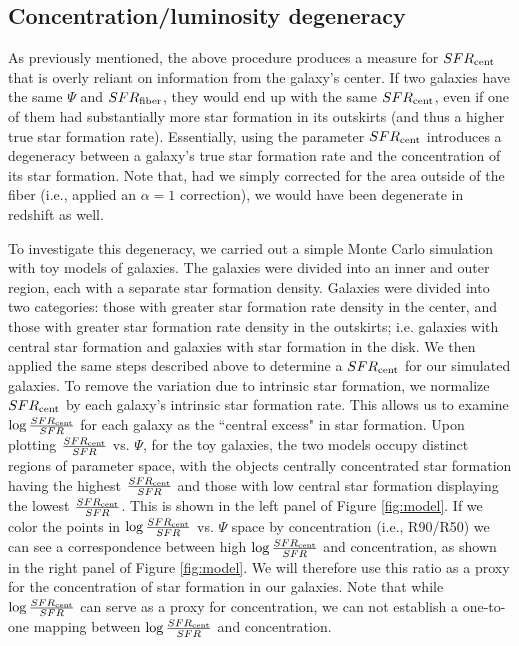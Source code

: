 \documentclass[iop]{emulateapj}
\begin{document}
\subsection{Concentration/luminosity degeneracy}
\label{sec:concdep}
As previously mentioned, the above procedure produces a measure for $SFR_{\rm cent}$ that is overly reliant on information from the galaxy's center. If two galaxies have the same $\Psi$ and $SFR_{\rm fiber}$, they would end up with the same $SFR_{\rm cent}$, even if one of them had substantially more star formation in its outskirts (and thus a higher true star formation rate). Essentially, using the parameter $SFR_{\rm cent}$ introduces a degeneracy between a galaxy's true star formation rate and the concentration of its star formation. Note that, had we simply corrected for the area outside of the fiber (i.e., applied an $\alpha= 1$ correction), we would have been degenerate in redshift as well.

To investigate this degeneracy, we carried out a simple Monte Carlo simulation with toy models of galaxies. The galaxies were divided into an inner and outer region, each with a separate star formation density. Galaxies were divided into two categories: those with greater star formation rate density in the center, and those with greater star formation rate density in the outskirts; i.e. galaxies with central star formation and galaxies with star formation in the disk. We then applied the same steps described above to determine a $SFR_{\rm cent}$ for our simulated galaxies. To remove the variation due to intrinsic star formation, we normalize $SFR_{\rm cent}$ by each galaxy's intrinsic star formation rate. This allows us to examine $ \log \frac{SFR_{\rm cent}}{SFR}$ for each galaxy as the ``central excess" in star formation. Upon plotting $\frac{SFR_{\rm cent}}{SFR}$ vs. $\Psi$, for the toy galaxies, the two models occupy distinct regions of parameter space, with the objects centrally concentrated star formation having the highest $\frac{SFR_{\rm cent}}{SFR}$ and those with low central star formation displaying the lowest $\frac{SFR_{\rm cent}}{SFR}$. This is shown in the left panel of Figure \ref{fig:model}. If we color the points in $ \log \frac{SFR_{\rm cent}}{SFR}$ vs. $\Psi$ space by concentration (i.e., R90/R50) we can see a correspondence between high $\log \frac{SFR_{\rm cent}}{SFR}$ and concentration, as shown in the right panel of Figure \ref{fig:model}. We will therefore use this ratio as a proxy for the concentration of star formation in our galaxies. Note that while $\log \frac{SFR_{\rm cent}}{SFR}$ can serve as a proxy for concentration, we can not establish a one-to-one mapping between $\log \frac{SFR_{\rm cent}}{SFR}$ and concentration. 
\end{document}
